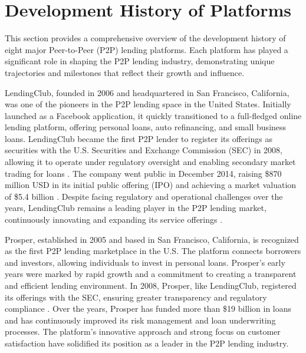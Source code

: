 \documentclass{article}
\begin{document}
\section{Development History of Platforms}
This section provides a comprehensive overview of the development history of eight major Peer-to-Peer (P2P) lending platforms. Each platform has played a significant role in shaping the P2P lending industry, demonstrating unique trajectories and milestones that reflect their growth and influence.

LendingClub, founded in 2006 and headquartered in San Francisco, California, was one of the pioneers in the P2P lending space in the United States. Initially launched as a Facebook application, it quickly transitioned to a full-fledged online lending platform, offering personal loans, auto refinancing, and small business loans. LendingClub became the first P2P lender to register its offerings as securities with the U.S. Securities and Exchange Commission (SEC) in 2008, allowing it to operate under regulatory oversight and enabling secondary market trading for loans \citep{lendingclub_bank_about_2024}. The company went public in December 2014, raising \$870 million USD in its initial public offering (IPO) and achieving a market valuation of \$5.4 billion \citep{platt_lending_2014}. Despite facing regulatory and operational challenges over the years, LendingClub remains a leading player in the P2P lending market, continuously innovating and expanding its service offerings \citep{engel_p2p_2016}.

Prosper, established in 2005 and based in San Francisco, California, is recognized as the first P2P lending marketplace in the U.S. The platform connects borrowers and investors, allowing individuals to invest in personal loans. Prosper's early years were marked by rapid growth and a commitment to creating a transparent and efficient lending environment. In 2008, Prosper, like LendingClub, registered its offerings with the SEC, ensuring greater transparency and regulatory compliance \citep{p2pmarketdata_p2pmarketdata_2018}. Over the years, Prosper has funded more than \$19 billion in loans and has continuously improved its risk management and loan underwriting processes. The platform's innovative approach and strong focus on customer satisfaction have solidified its position as a leader in the P2P lending industry.
\end{document}
